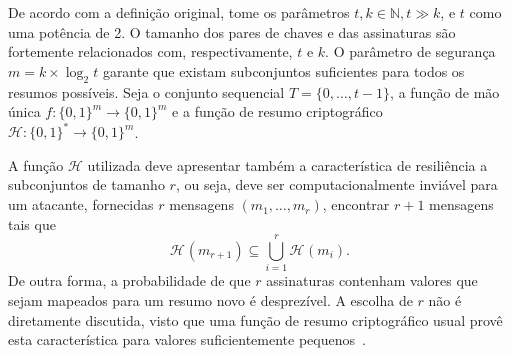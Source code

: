 \documentclass{ufsctex/ufsctex}
\newcommand{\hh}{\mathcal{H}}
\newcommand{\hash}[2][]{\mathcal{H}^{#1} (#2)}
\newcommand{\binwds}[1]{\{0, 1\}^{#1}}
\newcommand{\fhash}[1]{\hh{}: \binwds{*} \longrightarrow{} \binwds{#1}}
\begin{document}
De acordo com a definição original, tome os parâmetros $t, k \in \mathbb{N}, t
\gg k$, e $t$ como uma potência de 2. O tamanho
dos pares de chaves e das assinaturas são fortemente relacionados com,
respectivamente, $t$ e $k$. O parâmetro de segurança $m = k \times \log_2 t$
garante que existam subconjuntos suficientes para todos os resumos possíveis.
Seja o conjunto sequencial $T = \{0, \dots, t - 1\}$, a função de mão única $f
: \binwds{m} \longrightarrow \binwds{m}$ e a função de resumo criptográfico
$\fhash{m}$.

A função $\hh{}$ utilizada deve apresentar também a característica de
resiliência a subconjuntos de tamanho $r$, ou seja, deve ser computacionalmente
inviável para um atacante, fornecidas $r$ mensagens $(m_{1}, \dots, m_{r})$,
encontrar $r + 1$ mensagens tais que
\begin{equation}
  \hash{m_{r + 1}} \subseteq \bigcup^{r}_{i = 1} \hash{m_{i}}.
\end{equation}
De outra forma, a probabilidade de que $r$ assinaturas contenham valores que
sejam mapeados para um resumo novo é desprezível. A escolha de $r$ não é
diretamente discutida, visto que uma função de resumo criptográfico usual provê
esta característica para valores suficientemente pequenos~\cite[Apêndice
A]{Reyzin:inproc:2002:jul}.
\end{document}
